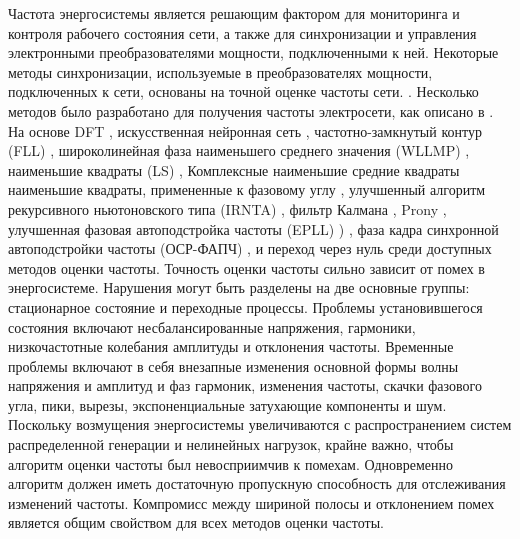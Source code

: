 Частота энергосистемы является решающим фактором для мониторинга и контроля рабочего состояния сети, а также для синхронизации и управления электронными преобразователями мощности, подключенными к ней. Некоторые методы синхронизации, используемые в преобразователях мощности, подключенных к сети, основаны на точной оценке частоты сети. 
\cite{lee2013novel, lee2011active}. Несколько методов было разработано для получения частоты электросети, как описано в \cite{chen2013comparative}. На основе DFT \cite{borkowski2014interpolated,kamwa2004performance}, искусственная нейронная сеть \cite{jiang2014frequency}, частотно-замкнутый контур (FLL) \cite{fedele2014frequency}, широколинейная фаза наименьшего среднего значения (WLLMP) \cite{xia2014widely}, наименьшие квадраты (LS) \cite{kuvsljevic2013ls}, Комплексные наименьшие средние квадраты \cite{pradhan2005power, xia2014complex} наименьшие квадраты, примененные к фазовому углу \cite{ramos2015frequency}, улучшенный алгоритм рекурсивного ньютоновского типа (IRNTA) \cite{ray2015improved}, фильтр Калмана \cite{routray2002novel}, Prony \cite{rubeena2014accurate}, улучшенная фазовая автоподстройка частоты (EPLL) ) \cite{karimi2010application}, фаза кадра синхронной автоподстройки частоты (ОСР-ФАПЧ) \cite{golestan2013performance}, и переход через нуль \cite{ramos2005synchronizing} среди доступных методов оценки частоты.
Точность оценки частоты сильно зависит от помех в энергосистеме. Нарушения могут быть разделены на две основные группы: стационарное состояние и переходные процессы. Проблемы установившегося состояния включают несбалансированные напряжения, гармоники, низкочастотные колебания амплитуды и отклонения частоты. Временные проблемы включают в себя внезапные изменения основной формы волны напряжения и амплитуд и фаз гармоник, изменения частоты, скачки фазового угла, пики, вырезы, экспоненциальные затухающие компоненты и шум. Поскольку возмущения энергосистемы увеличиваются с распространением систем распределенной генерации и нелинейных нагрузок, крайне важно, чтобы алгоритм оценки частоты был невосприимчив к помехам. Одновременно алгоритм должен иметь достаточную пропускную способность для отслеживания изменений частоты. Компромисс между шириной полосы и отклонением помех является общим свойством для всех методов оценки частоты.
